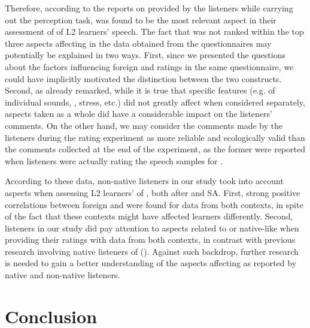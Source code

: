 \documentclass[output=paper]{langsci/langscibook}
\begin{document}
 
Therefore, according to the reports on  provided by the listeners while carrying out the perception task,  was found to be the most relevant aspect in their assessment of  of {L2} learners' speech.  The fact that  was not ranked within the top three aspects affecting  in the data obtained from the questionnaires may potentially be explained in two ways. First, since we presented the questions about the factors influencing foreign  and  ratings in the same questionnaire, we could have implicitly motivated the distinction between the two constructs. Second, as already remarked, while it is true that specific  features (e.g.  of individual sounds, , stress, etc.) did not greatly affect  when considered separately,  aspects taken as a whole did have a considerable impact on the listeners’ comments. On the other hand, we may consider the comments made by the listeners during the rating experiment as more reliable and ecologically valid than the comments collected at the end of the experiment, as the former were reported when listeners were actually rating the speech samples for . 

According to these data, non-native listeners in our study took into account  aspects when assessing {L2} learners’  of , both after  and SA. First, strong positive correlations between foreign  and  were found for data from both contexts, in spite of the fact that these contexts might have affected learners differently. Second, listeners in our study did pay attention to aspects related to  or native-like  when providing their  ratings with data from both contexts, in contrast with previous research involving native listeners of  (\citealt{TrofimovichIsaacs2012}). Against such backdrop, further research is needed to gain a better understanding of the aspects affecting  as reported by native and non-native listeners.


\section{Conclusion}
\end{document}
